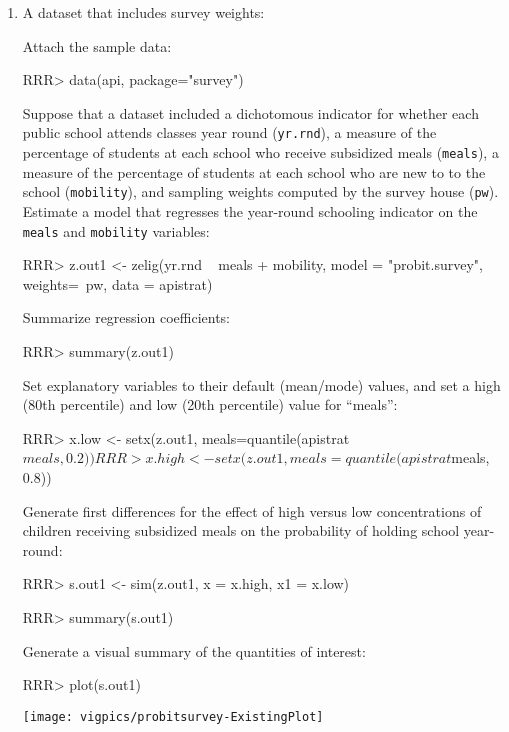 \begin{enumerate} 

\item A dataset that includes survey weights:

Attach the sample data: 
\begin{Schunk}
\begin{Sinput}
RRR> data(api, package="survey") 
\end{Sinput}
\end{Schunk}

Suppose that a dataset included a dichotomous indicator 
for whether each public school attends classes year round ({\tt yr.rnd}), a measure of 
the percentage of students at each school who receive subsidized 
meals ({\tt meals}), a measure of the percentage of students at 
each school who are new to to the school ({\tt mobility}), and sampling 
weights computed by the survey house ({\tt pw}).  Estimate a model
that regresses the year-round schooling indicator on the {\tt meals} and {\tt mobility}
variables:
\begin{Schunk}
\begin{Sinput}
RRR> z.out1 <- zelig(yr.rnd ~ meals + mobility, model = "probit.survey", weights=~pw, data = apistrat)
\end{Sinput}
\end{Schunk}
Summarize regression coefficients:
\begin{Schunk}
\begin{Sinput}
RRR>  summary(z.out1)
\end{Sinput}
\end{Schunk}
Set explanatory variables to their default (mean/mode) values, and
set a high (80th percentile) and low (20th percentile) value for
``meals'': 
\begin{Schunk}
\begin{Sinput}
RRR> x.low <- setx(z.out1, meals=quantile(apistrat$meals, 0.2)) 
RRR> x.high <- setx(z.out1, meals=quantile(apistrat$meals, 0.8)) 
\end{Sinput}
\end{Schunk}
Generate first differences for the
effect of high versus low concentrations of children receiving
subsidized meals on the probability of holding school year-round: 
\begin{Schunk}
\begin{Sinput}
RRR>  s.out1 <- sim(z.out1, x = x.high, x1 = x.low)
\end{Sinput}
\end{Schunk}
\begin{Schunk}
\begin{Sinput}
RRR>  summary(s.out1)
\end{Sinput}
\end{Schunk}
Generate a visual summary of the quantities of interest:
\begin{center}
\begin{Schunk}
\begin{Sinput}
RRR>  plot(s.out1)
\end{Sinput}
\end{Schunk}
\texttt{[image: vigpics/probitsurvey-ExistingPlot]}
\end{center}


\end{enumerate}
